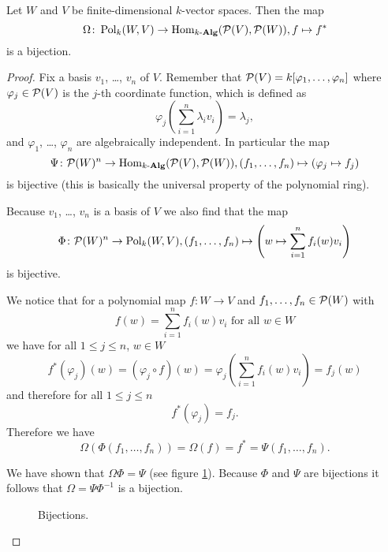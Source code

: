\begin{prop}
  Let $W$ and $V$ be finite-dimensional $k$-vector spaces.
  Then the map
  \[
            \Omega
    \colon  \operatorname{Pol}_k(W,V)
    \to     \operatorname{Hom}_{k\text{-}\mathbf{Alg}}(\mathcal{P}(V), \mathcal{P}(W)),
            f
    \mapsto f^*
  \]
  is a bijection.
\end{prop}
\begin{proof}
  Fix a basis $v_1$, \dots, $v_n$ of $V$.
  Remember that $\mathcal{P}(V) = k[\varphi_1, \dotsc, \varphi_n]$ where $\varphi_j \in \mathcal{P}(V)$ is the $j$-th coordinate function, which is defined as
  \[
      \varphi_j\left( \sum_{i=1}^n \lambda_i v_i \right)
    = \lambda_j,
\]
  and $\varphi_1$, \dots, $\varphi_n$ are algebraically independent.
  In particular the map
  \[
            \Psi
    \colon  \mathcal{P}(W)^n
    \to     \operatorname{Hom}_{k\text{-}\mathbf{Alg}}(\mathcal{P}(V),\mathcal{P}(W)),
            (f_1, \dotsc, f_n)
    \mapsto (\varphi_j \mapsto f_j)
  \]
  is bijective (this is basically the universal property of the polynomial ring).
  
  Because $v_1$, \dots, $v_n$ is a basis of $V$ we also find that the map
  \[
            \Phi
    \colon  \mathcal{P}(W)^n
    \to     \operatorname{Pol}_k(W,V),
            (f_1, \dotsc, f_n)
    \mapsto \left(
                      w
              \mapsto \sum_{i=1}^n f_i(w)v_i
            \right)
  \]
  is bijective.
  
  We notice that for a polynomial map $f \colon W \to V$ and $f_1, \dotsc, f_n \in \mathcal{P}(W)$ with
  \[
      f(w)
    = \sum_{i=1}^n f_i(w) v_i
    \text{ for all }
    w \in W
  \]
  we have for all $1 \leq j \leq n$, $w \in W$
  \[
      f^*(\varphi_j)(w)
    = (\varphi_j \circ f)(w)
    = \varphi_j\left( \sum_{i=1}^n f_i(w) v_i \right)
    = f_j(w)
  \]
  and therefore for all $1 \leq j \leq n$
  \[
      f^*(\varphi_j)
    = f_j.
  \]
  Therefore we have
  \[
      \Omega(\Phi(f_1, \dotsc, f_n))
    = \Omega(f)
    = f^*
    = \Psi(f_1, \dotsc, f_n).
  \]
  
  We have shown that $\Omega \Phi = \Psi$ (see figure \ref{fig: bijections}).
  Because $\Phi$ and $\Psi$ are bijections it follows that $\Omega = \Psi \Phi^{-1}$ is a bijection.
  \qedhere
  
  \begin{figure}\centering
    \caption{Bijections.}
    \label{fig: bijections}
  \end{figure}
\end{proof}






